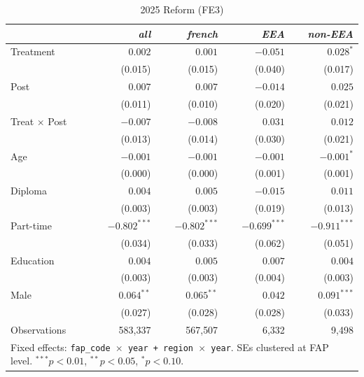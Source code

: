 \documentclass[10pt, a4paper]{article}
\begin{document}
\begin{table}[h!]
\caption{2025 Reform (FE3)\label{tab:did2025_fe3}}
\centering
\setlength{\tabcolsep}{25pt}
\begin{tabular}{lrrrr}
 & \textit{all} & \textit{french} & \textit{EEA} & \textit{non-EEA} \\
\midrule
\midrule
Treatment & $0.002$ & $0.001$ & $-0.051$ & $0.028^{*}$ \\
 & (0.015) & (0.015) & (0.040) & (0.017) \\[2pt]
Post & $0.007$ & $0.007$ & $-0.014$ & $0.025$ \\
 & (0.011) & (0.010) & (0.020) & (0.021) \\[2pt]
Treat$\,\times\,$Post & $-0.007$ & $-0.008$ & $0.031$ & $0.012$ \\
 & (0.013) & (0.014) & (0.030) & (0.021) \\[2pt]
\midrule
Age & $-0.001$ & $-0.001$ & $-0.001$ & $-0.001^{*}$ \\
 & (0.000) & (0.000) & (0.001) & (0.001) \\[2pt]
Diploma & $0.004$ & $0.005$ & $-0.015$ & $0.011$ \\
 & (0.003) & (0.003) & (0.019) & (0.013) \\[2pt]
Part-time & $-0.802^{***}$ & $-0.802^{***}$ & $-0.699^{***}$ & $-0.911^{***}$ \\
 & (0.034) & (0.033) & (0.062) & (0.051) \\[2pt]
Education & $0.004$ & $0.005$ & $0.007$ & $0.004$ \\
 & (0.003) & (0.003) & (0.004) & (0.003) \\[2pt]
Male & $0.064^{**}$ & $0.065^{**}$ & $0.042$ & $0.091^{***}$ \\
 & (0.027) & (0.028) & (0.028) & (0.033) \\[2pt]
\midrule
Observations & 583{,}337 & 567{,}507 & 6{,}332 & 9{,}498 \\
\bottomrule
\multicolumn{5}{p{0.88\linewidth}}{\footnotesize Fixed effects: \texttt{fap\_code $\times$ year + region $\times$ year}. SEs clustered at FAP level. $^{***}p<0.01$, $^{**}p<0.05$, $^{*}p<0.10$.}\\
\end{tabular}
\end{table}
\end{document}
